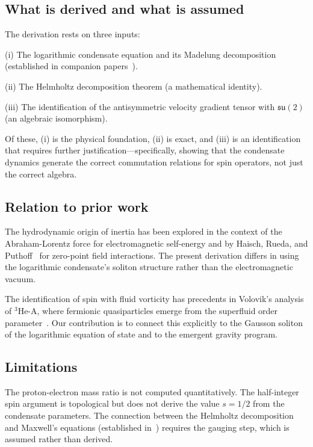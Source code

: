 \documentclass[12pt, a4paper]{article}
\begin{document}
\subsection{What is derived and what is assumed}

The derivation rests on three inputs:

(i) The logarithmic condensate equation and its
Madelung decomposition (established in companion
papers~\cite{kulangiev_gravity}).

(ii) The Helmholtz decomposition theorem (a
mathematical identity).

(iii) The identification of the antisymmetric velocity
gradient tensor with $\mathfrak{su}(2)$ (an algebraic
isomorphism).

Of these, (i) is the physical foundation, (ii) is
exact, and (iii) is an identification that requires
further justification---specifically, showing that
the condensate dynamics generate the correct
commutation relations for spin operators, not just
the correct algebra.

\subsection{Relation to prior work}

The hydrodynamic origin of inertia has been explored
in the context of the Abraham-Lorentz force for
electromagnetic self-energy and by Haisch, Rueda, and
Puthoff~\cite{haisch_1994} for zero-point field
interactions. The present derivation differs in
using the logarithmic condensate's soliton structure
rather than the electromagnetic vacuum.

The identification of spin with fluid vorticity has
precedents in Volovik's analysis of $^3$He-A, where
fermionic quasiparticles emerge from the superfluid
order parameter~\cite{volovik_2003}. Our contribution
is to connect this explicitly to the Gausson soliton
of the logarithmic equation of state and to the
emergent gravity program.

\subsection{Limitations}

The proton-electron mass ratio is not computed
quantitatively. The half-integer spin argument is
topological but does not derive the value $s = 1/2$
from the condensate parameters. The connection
between the Helmholtz decomposition and Maxwell's
equations (established
in~\cite{kulangiev_maxwell}) requires the gauging
step, which is assumed rather than derived.
\end{document}
